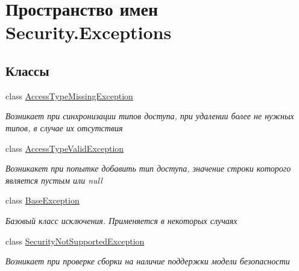 \hypertarget{namespace_security_1_1_exceptions}{}\section{Пространство имен Security.\+Exceptions}
\label{namespace_security_1_1_exceptions}
\subsection*{Классы}
\begin{DoxyCompactItemize}
\item 
class \hyperlink{class_security_1_1_exceptions_1_1_access_type_missing_exception}{Access\+Type\+Missing\+Exception}
\begin{DoxyCompactList}\small\item\em Возникает при синхронизации типов доступа, при удалении более не нужных типов, в случае их отсутствия \end{DoxyCompactList}\item 
class \hyperlink{class_security_1_1_exceptions_1_1_access_type_valid_exception}{Access\+Type\+Valid\+Exception}
\begin{DoxyCompactList}\small\item\em Возникакет при попытке добавить тип доступа, значение строки которого является пустым или null \end{DoxyCompactList}\item 
class \hyperlink{class_security_1_1_exceptions_1_1_base_exception}{Base\+Exception}
\begin{DoxyCompactList}\small\item\em Базовый класс исключения. Применяется в некоторых случаях \end{DoxyCompactList}\item 
class \hyperlink{class_security_1_1_exceptions_1_1_security_not_supported_exception}{Security\+Not\+Supported\+Exception}
\begin{DoxyCompactList}\small\item\em Возникает при проверке сборки на наличие поддержки модели безопасности \end{DoxyCompactList}\end{DoxyCompactItemize}
